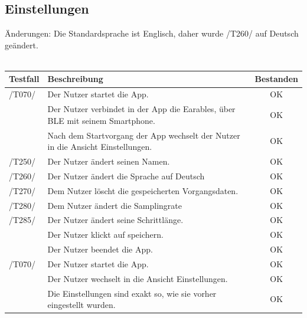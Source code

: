 \documentclass[a4paper,12pt]{article}
\newcommand{\testok}[0]{
	\cellcolor{green!25} OK
}
\begin{document}
\subsection{Einstellungen}
Änderungen: Die Standardsprache ist Englisch, daher wurde /T260/ auf Deutsch geändert.
\\
\\
\begin{tabular}{ |p{1.5cm} | p{12cm} | c| }
	\hline
	\textbf{Testfall} & \textbf{Beschreibung} & \textbf{Bestanden}\\
	\hline
	/T070/ & Der Nutzer startet die App. & \testok \\
	\hline
	& Der Nutzer verbindet in der App die Earables, über BLE mit seinem Smartphone. & \testok  \\
	\hline
	& Nach dem Startvorgang der App wechselt der Nutzer in die Ansicht \glqq Einstellungen\grqq . & \testok \\
	\hline
	/T250/ & Der Nutzer ändert seinen Namen. & \testok  \\
	\hline
	/T260/ & Der Nutzer ändert die Sprache auf Deutsch & \testok  \\
	\hline
	/T270/ & Dem Nutzer löscht die gespeicherten Vorgangsdaten. & \testok  \\
	\hline
	/T280/ & Dem Nutzer ändert die Samplingrate & \testok  \\
	\hline
	/T285/ & Der Nutzer ändert seine Schrittlänge. & \testok  \\
	\hline
	& Der Nutzer klickt auf speichern. & \testok  \\
	\hline
	& Der Nutzer beendet die App. & \testok  \\
	\hline
	/T070/ & Der Nutzer startet die App. & \testok  \\
	\hline
	& Der Nutzer wechselt in die Ansicht \glqq Einstellungen\grqq . & \testok  \\
	\hline
	& Die Einstellungen sind exakt so, wie sie vorher eingestellt wurden. & \testok  \\
	\hline
\end{tabular}
\end{document}
